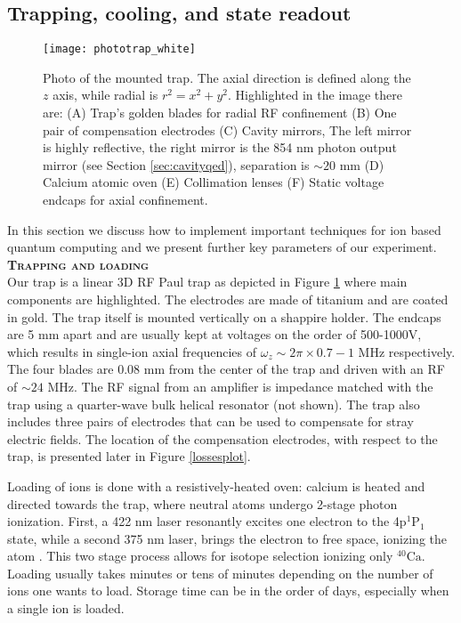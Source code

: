 \subsection{Trapping, cooling, and state readout}
\label{sec:expparameters}
\begin{figure}
\centering
\texttt{[image: phototrap\_white]}
\caption{Photo of the mounted trap. The axial direction is defined along the $z$ axis, while radial is $r^2 = x^2 + y^2$. Highlighted in the image there are: (A) Trap's golden blades for radial RF confinement (B) One pair of compensation electrodes (C) Cavity mirrors, The left mirror is highly reflective, the right mirror is the 854 nm photon output mirror (see Section \ref{sec:cavityqed}), separation is $\sim 20$ mm (D) Calcium atomic oven (E) Collimation lenses (F) Static voltage endcaps for axial confinement.}
\label{trapphoto}
\end{figure}
In this section we discuss how to implement important techniques for ion based quantum computing and we present further key parameters of our experiment.\vspace{.5em}\\
\textbf{\textsc{Trapping and loading}}\\
Our trap is a linear 3D RF Paul trap as depicted in Figure \ref{trapphoto} where main components are highlighted. The electrodes are made of titanium and are coated in gold. The trap itself is mounted vertically on a shappire holder. The endcaps are 5 mm apart and are usually kept at voltages on the order of 500-1000V, which results in single-ion axial frequencies of $\omega_z \sim 2\pi \times 0.7-1$ MHz respectively. The four blades are 0.08 mm from the center of the trap and driven with an RF of $\sim 24$ MHz. The RF signal from an amplifier is impedance matched with the trap using a quarter-wave bulk helical resonator (not shown). The trap also includes three pairs of electrodes that can be used to compensate for stray electric fields. The location of the compensation electrodes, with respect to the trap, is presented later in Figure \ref{lossesplot}.\par
Loading of ions is done with a resistively-heated oven: calcium is heated and directed towards the trap, where neutral atoms undergo 2-stage photon ionization. First, a 422 nm laser resonantly excites one electron to the 4p$^1\text{P}_1$ state, while a second 375 nm laser, brings the electron to free space, ionizing the atom \cite{Gulde2001}. This two stage process allows for isotope selection ionizing only $^{40}\text{Ca}$. Loading usually takes minutes or tens of minutes depending on the number of ions one wants to load. Storage time can be in the order of days, especially when a single ion is loaded.\vspace{.5em}\\
